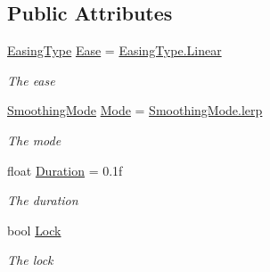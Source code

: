 \subsection*{Public Attributes}
\begin{DoxyCompactItemize}
\item 
\hyperlink{namespace_radical_library_a2d6877adaf2ec492cf30c572aa684e6f}{Easing\+Type} \hyperlink{class_radical_library_1_1_smooth_vector3_a4aed287600e7d2c12203d098556612d8}{Ease} = \hyperlink{namespace_radical_library_a2d6877adaf2ec492cf30c572aa684e6fa32a843da6ea40ab3b17a3421ccdf671b}{Easing\+Type.\+Linear}
\begin{DoxyCompactList}\small\item\em The ease \end{DoxyCompactList}\item 
\hyperlink{namespace_radical_library_a53ca8c4ff40f917ad8d03bb2c0dbd548}{Smoothing\+Mode} \hyperlink{class_radical_library_1_1_smooth_vector3_a8ae26fac85686d14a2a1dd56e3832077}{Mode} = \hyperlink{namespace_radical_library_a53ca8c4ff40f917ad8d03bb2c0dbd548af276cc520db3c6e67c238feefa5130ab}{Smoothing\+Mode.\+lerp}
\begin{DoxyCompactList}\small\item\em The mode \end{DoxyCompactList}\item 
float \hyperlink{class_radical_library_1_1_smooth_vector3_af2a047088e4e9dd49cf95202782d36c1}{Duration} = 0.\+1f
\begin{DoxyCompactList}\small\item\em The duration \end{DoxyCompactList}\item 
bool \hyperlink{class_radical_library_1_1_smooth_vector3_a656550e3ddafe5b7315116de5f57d76f}{Lock}
\begin{DoxyCompactList}\small\item\em The lock \end{DoxyCompactList}\end{DoxyCompactItemize}
